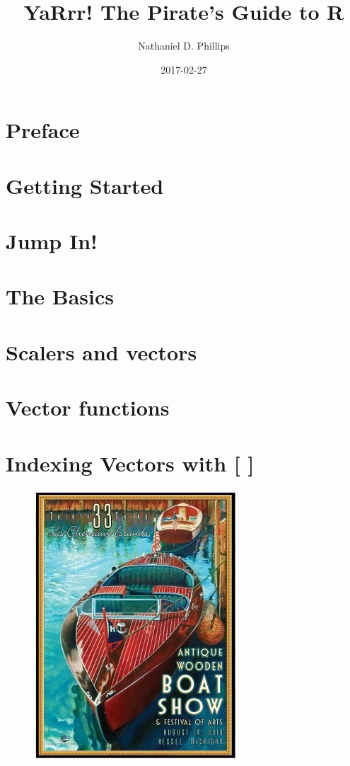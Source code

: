 \documentclass[]{book}
\title{YaRrr! The Pirate's Guide to R}
\author{Nathaniel D. Phillips}
\date{2017-02-27}
\theoremstyle{definition}
\theoremstyle{definition}
\theoremstyle{remark}
\begin{document}
\maketitle

{
\setcounter{tocdepth}{1}
\tableofcontents
}
\chapter{Preface}\label{intro}

\chapter{Getting Started}\label{started}

\chapter{Jump In!}\label{jumpin}

\chapter{The Basics}\label{basics}

\chapter{Scalers and vectors}\label{scalersvectors}

\chapter{Vector functions}\label{vectorfunctions}

\chapter{Indexing Vectors with {[} {]}}\label{vectorindexing}

\begin{figure}

{\centering \includegraphics[width=0.5\linewidth]{images/antiqueboat} 

}

\end{figure}
\end{document}
